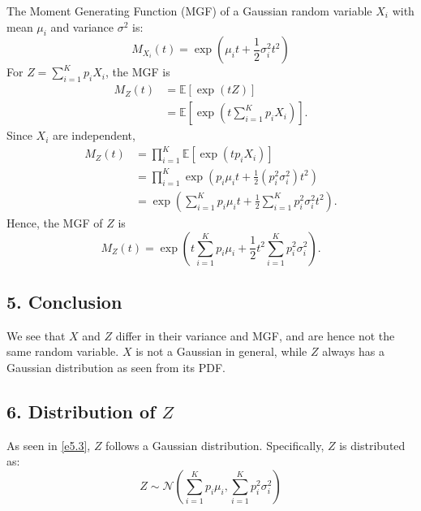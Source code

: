 The Moment Generating Function (MGF) of a Gaussian random variable $X_i$ with
mean $\mu_i$ and variance $\sigma^2$ is:
\begin{equation*}
    M_{X_i}(t) = \exp \left( \mu_i t + \frac{1}{2} \sigma_i^2 t^2 \right)
\end{equation*}
For $Z = \sum_{i=1}^K p_i X_i$, the MGF is
\begin{equation*}
    \begin{aligned}
        M_Z(t) &= \mathbb{E} \left[ \exp(tZ) \right] \\
        &= \mathbb{E}\left[\exp\left(t\sum_{i=1}^K p_i X_i\right)\right].
    \end{aligned}
\end{equation*}
Since $X_i$ are independent, 
\begin{equation*}
    \begin{aligned}
        M_Z(t) &= \prod_{i=1}^K \mathbb{E}
        \left[ \exp \left( t p_i X_i \right) \right] \\
        &= \prod_{i=1}^K \exp
        \left( p_i \mu_i t + \frac{1}{2} (p_i^2 \sigma_i^2) t^2 \right) \\
        &= \exp \left( \sum_{i=1}^K p_i \mu_i t + \frac{1}{2}
        \sum_{i=1}^K p_i^2 \sigma_i^2 t^2 \right).
    \end{aligned}
\end{equation*}
Hence, the MGF of $Z$ is
\begin{equation*}
    M_Z(t) = \exp \left( t\sum_{i=1}^K p_i \mu_i + \frac{1}{2}t^2\sum_{i=1}^K
    p_i^2 \sigma_i^2 \right).
\end{equation*}

\subsection*{5. Conclusion}

We see that $X$ and $Z$ differ in their variance and MGF, and are hence not the
same random variable. $X$ is not a Gaussian in general, while $Z$ always has a
Gaussian distribution as seen from its PDF.

\subsection*{6. Distribution of $Z$}
As seen in \ref{e5.3}, $Z$ follows a Gaussian distribution. Specifically, $Z$ is
distributed as:
\begin{equation*}
    Z \sim \mathcal{N} \left( \sum_{i=1}^K p_i \mu_i, \sum_{i=1}^K p_i^2
    \sigma_i^2 \right)
\end{equation*}


